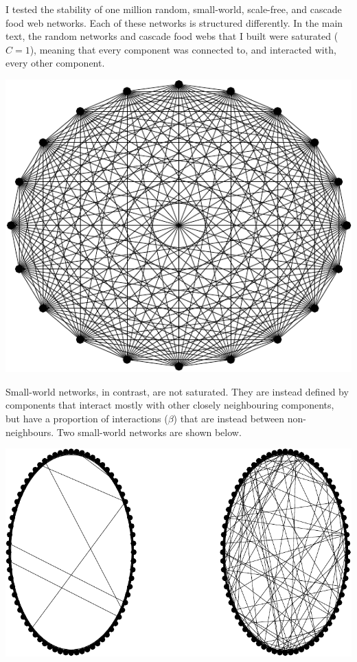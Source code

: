 \documentclass[]{article}
\begin{document}
I tested the stability of one million random, small-world, scale-free,
and cascade food web networks. Each of these networks is structured
differently. In the main text, the random networks and cascade food webs
that I built were saturated (\(C = 1\)), meaning that every component
was connected to, and interacted with, every other component.

\vspace{2mm}

\begin{center}\includegraphics{SI_files/figure-latex/unnamed-chunk-23-1} \end{center}

\vspace{2mm}

Small-world networks, in contrast, are not saturated. They are instead
defined by components that interact mostly with other closely
neighbouring components, but have a proportion of interactions
(\(\beta\)) that are instead between non-neighbours. Two small-world
networks are shown below.

\vspace{2mm}

\begin{center}\includegraphics{SI_files/figure-latex/unnamed-chunk-24-1} \end{center}
\end{document}
